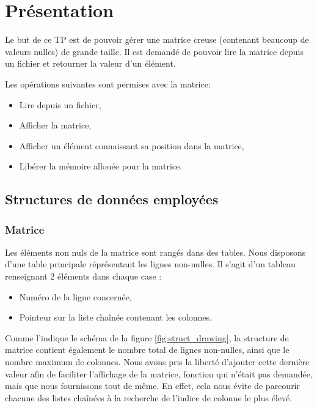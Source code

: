 \documentclass{report}
\newcommand{\blankpage}{\newpage \thispagestyle{empty} \addtocounter{page}{-1} \null \newpage}
\begin{document}
  
  \blankpage
  \tableofcontents
  \blankpage
  \setlength{\parskip}{10pt}
  \setlength{\parindent}{0pt}
  \chapter{Présentation}
    Le but de ce TP est de pouvoir gérer une matrice creuse (contenant beaucoup de valeurs nulles) de grande taille. Il est demandé de pouvoir lire la matrice depuis un fichier et retourner la valeur d'un élément.

    Les opérations suivantes sont permises avec la matrice:
    \begin{itemize}
      \item Lire depuis un fichier,
      \item Afficher la matrice,
      \item Afficher un élément connaissant sa position dans la matrice,
      \item Libérer la mémoire allouée pour la matrice.
    \end{itemize}

    \section{Structures de données employées}
      \subsection{Matrice}
        Les éléments non nuls de la matrice sont rangés dans des tables. Nous disposons d'une table principale réprésentant les lignes non-nulles. Il s'agit d'un tableau renseignant 2 éléments dans chaque case :
        \begin{itemize}
          \item Numéro de la ligne concernée,
          \item Pointeur sur la liste chaînée contenant les colonnes.
        \end{itemize}
        Comme l'indique le schéma de la figure \ref{fig:struct_drawing}, la structure de matrice contient également le nombre total de lignes non-nulles, ainsi que le nombre maximum de colonnes. Nous avons pris la liberté d'ajouter cette dernière valeur afin de faciliter l'affichage de la matrice, fonction qui n'était pas demandée, mais que nous fournissons tout de même. En effet, cela nous évite de parcourir chacune des listes chaînées à la recherche de l'indice de colonne le plus élevé.
\end{document}
